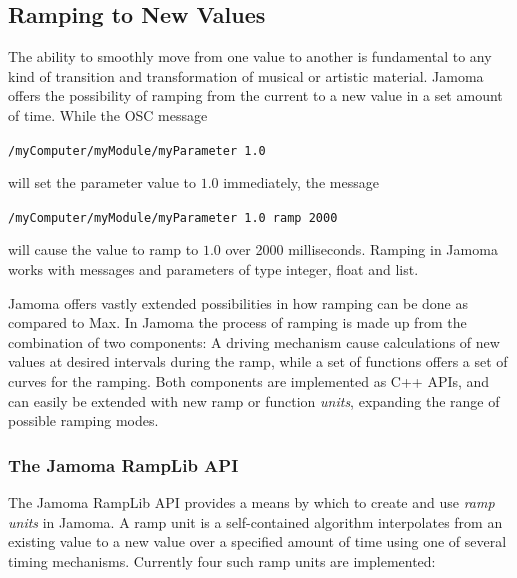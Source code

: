 \documentclass{NIME-alternate}
\begin{document}

\subsection{Ramping to New Values} %
\label{sub:ramping_to_new_values}

The ability to smoothly move from one value to another is fundamental to any kind of transition and transformation of musical or artistic material. Jamoma offers the possibility of ramping from the current to a new value in a set amount of time. While the OSC message

\texttt{/myComputer/myModule/myParameter 1.0}

\noindent
will set the parameter value to $1.0$ immediately, the message

\texttt{/myComputer/myModule/myParameter 1.0 ramp 2000}

\noindent
will cause the value to ramp to $1.0$ over 2000 milliseconds. Ramping in Jamoma works with messages and parameters of type integer, float and list.

Jamoma offers vastly extended possibilities in how ramping can be done as compared to Max. In Jamoma the process of ramping is made up from the combination of two components: A driving mechanism cause calculations of new values at desired intervals during the ramp, while a set of functions offers a set of curves for the ramping. Both components are implemented as C++ APIs, and can easily be extended with new ramp or function \emph{units}, expanding the range of possible ramping modes.



\subsubsection{The Jamoma RampLib API} %
\label{ssub:the_ramp_lib}

The Jamoma RampLib API provides a means by which to create and use \emph{ramp units} in Jamoma.  A ramp unit is a self-contained algorithm interpolates from an existing value to a new value over a specified amount of time using one of several timing mechanisms. Currently four such ramp units are implemented:
\end{document}

